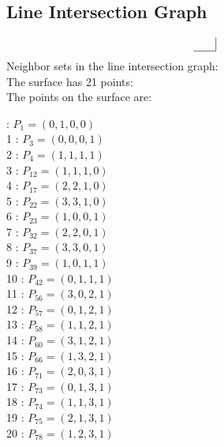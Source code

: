 \documentclass{article}
\begin{document}
{\subsection*{Line Intersection Graph}
{\arraycolsep=1pt
$$
\begin{array}{rr|*{0}r}
 & \\
\hline
\end{array}
$$
}%
Neighbor sets in the line intersection graph:\\
The surface has 21 points:\\
The points on the surface are:\\
\begin{multicols}{3}
 : $P_{1}=( 0, 1, 0, 0 )$\\
1 : $P_{3}=( 0, 0, 0, 1 )$\\
2 : $P_{4}=( 1, 1, 1, 1 )$\\
3 : $P_{12}=( 1, 1, 1, 0 )$\\
4 : $P_{17}=( 2, 2, 1, 0 )$\\
5 : $P_{22}=( 3, 3, 1, 0 )$\\
6 : $P_{23}=( 1, 0, 0, 1 )$\\
7 : $P_{32}=( 2, 2, 0, 1 )$\\
8 : $P_{37}=( 3, 3, 0, 1 )$\\
9 : $P_{39}=( 1, 0, 1, 1 )$\\
10 : $P_{42}=( 0, 1, 1, 1 )$\\
11 : $P_{56}=( 3, 0, 2, 1 )$\\
12 : $P_{57}=( 0, 1, 2, 1 )$\\
13 : $P_{58}=( 1, 1, 2, 1 )$\\
14 : $P_{60}=( 3, 1, 2, 1 )$\\
15 : $P_{66}=( 1, 3, 2, 1 )$\\
16 : $P_{71}=( 2, 0, 3, 1 )$\\
17 : $P_{73}=( 0, 1, 3, 1 )$\\
18 : $P_{74}=( 1, 1, 3, 1 )$\\
19 : $P_{75}=( 2, 1, 3, 1 )$\\
20 : $P_{78}=( 1, 2, 3, 1 )$\\
\end{multicols}


%


%


}%
\end{document}
